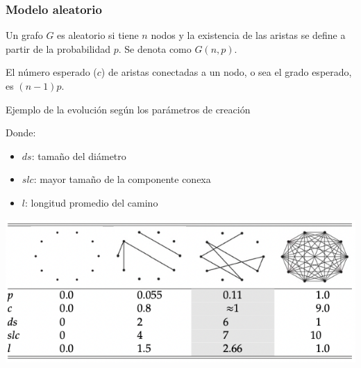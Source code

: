 \documentclass[
10pt, %
aspectratio=169, %
]{beamer}
\begin{document}
	\begin{frame}
		
		\frametitle{Modelo aleatorio}
		
		\begin{alertblock}{}
			Un grafo $G$ es aleatorio si tiene $n$ nodos y la existencia de las aristas se define a partir de la probabilidad $p$. Se denota como $G(n, p)$.
		\end{alertblock}
		
		\vspace{1\baselineskip}
		
		El número esperado ($c$) de aristas conectadas a un nodo, o sea el grado esperado, es $(n-1)p$.
			
		\pause
		\vspace{2\baselineskip}
		
		Ejemplo de la evolución según los parámetros de creación
		
		\begin{minipage}{0.3\textwidth}
			
			Donde:
			\begin{itemize}
				\item $ds$: tamaño del diámetro 
				\item $slc$: mayor tamaño de la componente conexa
				\item $l$: longitud promedio del camino
			\end{itemize}
			
		\end{minipage}%
		\hfill
		\begin{minipage}{0.6\textwidth}
			
			\includegraphics[scale=0.4]{evolucion-grafo-aleatorio.png}
			
			

\end{minipage}
\end{frame}
\end{document}

